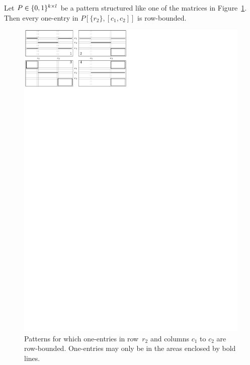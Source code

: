 \begin{lemma}
\label{lemma:H}
Let $P\in\{0,1\}^{k\times l}$ be a pattern structured like one of the matrices in Figure~\ref{fig:lemmaH}. Then every one-entry in $P[\{r_2\},[c_1,c_2]]$ is row-bounded.

\begin{figure}[!ht]
\centering
\includegraphics[width=\textwidth]{img/lemmaH.pdf}
\caption{Patterns for which one-entries in row~$r_2$ and columns $c_1$ to $c_2$ are row-bounded. One-entries may only be in the areas enclosed by bold lines.}
\label{fig:lemmaH}
\end{figure}
\end{lemma}
